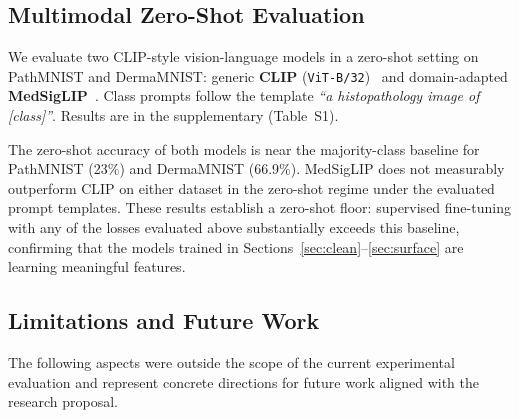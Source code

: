 \subsection{Multimodal Zero-Shot Evaluation}
\label{sec:multimodal}

We evaluate two CLIP-style vision-language models in a zero-shot setting
on PathMNIST and DermaMNIST:
generic \textbf{CLIP} (\texttt{ViT-B/32})~\citep{radford2021} and
domain-adapted \textbf{MedSigLIP}~\citep{ilharco2021}.
Class prompts follow the template \emph{``a histopathology image of [class]''}.
Results are in the supplementary (Table~S1).

The zero-shot accuracy of both models is near the majority-class baseline
for PathMNIST (23\%) and DermaMNIST (66.9\%).
MedSigLIP does not measurably outperform CLIP on either dataset in the
zero-shot regime under the evaluated prompt templates.
These results establish a zero-shot floor: supervised fine-tuning with
any of the losses evaluated above substantially exceeds this baseline,
confirming that the models trained in Sections~\ref{sec:clean}--\ref{sec:surface}
are learning meaningful features.

\subsection{Limitations and Future Work}
\label{sec:limitations}

The following aspects were outside the scope of the current experimental
evaluation and represent concrete directions for future work aligned with
the research proposal.

